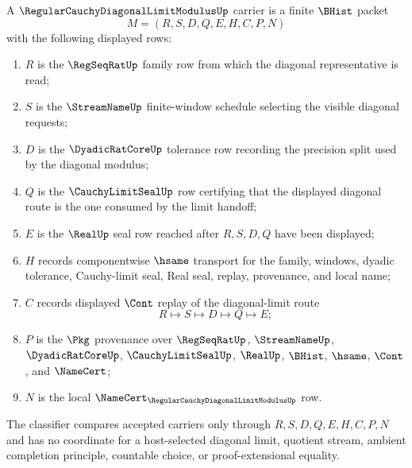 \begin{definition}
\label{def:regular-cauchy-diagonal-limit-modulus-carrier}
A $\RegularCauchyDiagonalLimitModulusUp$ carrier is a finite $\BHist$ packet
$$
M=(R,S,D,Q,E,H,C,P,N)
$$
with the following displayed rows:
\begin{enumerate}
\item $R$ is the $\RegSeqRatUp$ family row from which the diagonal representative is read;
\item $S$ is the $\StreamNameUp$ finite-window schedule selecting the visible diagonal requests;
\item $D$ is the $\DyadicRatCoreUp$ tolerance row recording the precision split used by the diagonal modulus;
\item $Q$ is the $\CauchyLimitSealUp$ row certifying that the displayed diagonal route is the one consumed by the limit handoff;
\item $E$ is the $\RealUp$ seal row reached after $R,S,D,Q$ have been displayed;
\item $H$ records componentwise $\hsame$ transport for the family, windows, dyadic tolerance, Cauchy-limit seal, Real seal, replay, provenance, and local name;
\item $C$ records displayed $\Cont$ replay of the diagonal-limit route
$$
R \longmapsto S \longmapsto D \longmapsto Q \longmapsto E ;
$$
\item $P$ is the $\Pkg$ provenance over $\RegSeqRatUp$, $\StreamNameUp$, $\DyadicRatCoreUp$, $\CauchyLimitSealUp$, $\RealUp$, $\BHist$, $\hsame$, $\Cont$, and $\NameCert$;
\item $N$ is the local $\NameCert_{\RegularCauchyDiagonalLimitModulusUp}$ row.
\end{enumerate}
The classifier compares accepted carriers only through $R,S,D,Q,E,H,C,P,N$ and has no coordinate for a host-selected diagonal limit, quotient stream, ambient completion principle, countable choice, or proof-extensional equality.
\end{definition}

